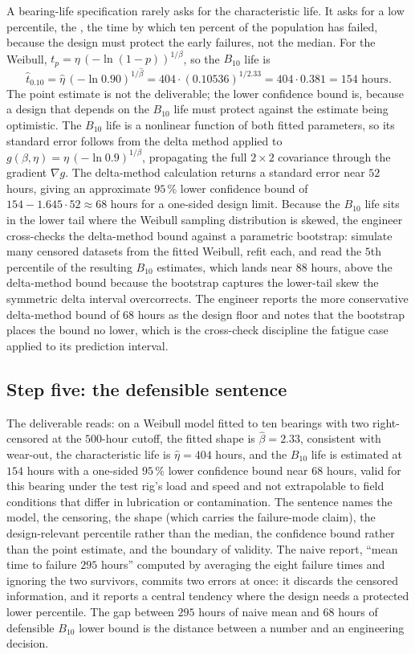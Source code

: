 A bearing-life specification rarely asks for the characteristic life.
It asks for a low percentile, the , the time by
which ten percent of the population has failed, because the design
must protect the early failures, not the median. For the Weibull,
$t_{p} = \eta\,(-\ln(1 - p))^{1/\beta}$, so the $B_{10}$ life is
\[
\hat{t}_{0.10} = \hat{\eta}\,(-\ln 0.90)^{1/\hat{\beta}}
= 404 \cdot (0.10536)^{1/2.33}
= 404 \cdot 0.381 = 154 \text{ hours}.
\]
The point estimate is not the deliverable; the lower confidence bound
is, because a design that depends on the $B_{10}$ life must protect
against the estimate being optimistic. The $B_{10}$ life is a
nonlinear function of both fitted parameters, so its standard error
follows from the delta method applied to $g(\beta, \eta) = \eta\,
(-\ln 0.9)^{1/\beta}$, propagating the full $2\times2$ covariance
through the gradient $\nabla g$. The delta-method calculation returns
a standard error near $52$ hours, giving an approximate $95\,\%$
lower confidence bound of $154 - 1.645 \cdot 52 \approx 68$ hours for
a one-sided design limit. Because the $B_{10}$ life sits in the lower
tail where the Weibull sampling distribution is skewed, the engineer
cross-checks the delta-method bound against a parametric bootstrap:
simulate many censored datasets from the fitted Weibull, refit each,
and read the $5$th percentile of the resulting $B_{10}$ estimates,
which lands near $88$ hours, above the delta-method bound because the
bootstrap captures the lower-tail skew the symmetric delta interval
overcorrects. The engineer reports the more conservative
delta-method bound of $68$ hours as the design floor and notes that
the bootstrap places the bound no lower, which is the cross-check
discipline the fatigue case applied to its prediction interval.

\subsection{Step five: the defensible sentence}

The deliverable reads: on a Weibull model fitted to ten bearings with
two right-censored at the $500$-hour cutoff, the fitted shape is
$\hat{\beta} = 2.33$, consistent with wear-out, the characteristic
life is $\hat{\eta} = 404$ hours, and the $B_{10}$ life is estimated
at $154$ hours with a one-sided $95\,\%$ lower confidence bound near
$68$ hours, valid for this bearing under the test rig's load and
speed and not extrapolable to field conditions that differ in
lubrication or contamination. The sentence names the model, the
censoring, the shape (which carries the failure-mode claim), the
design-relevant percentile rather than the median, the confidence
bound rather than the point estimate, and the boundary of validity.
The naive report, ``mean time to failure $295$ hours'' computed by
averaging the eight failure times and ignoring the two survivors,
commits two errors at once: it discards the censored information, and
it reports a central tendency where the design needs a protected lower
percentile. The gap between $295$ hours of naive mean and $68$ hours
of defensible $B_{10}$ lower bound is the distance between a number
and an engineering decision.


